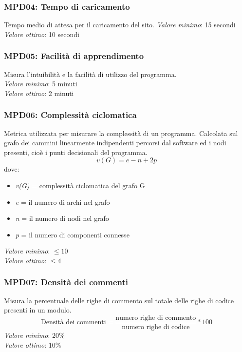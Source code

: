 \subsubsection{MPD04: Tempo di caricamento}
Tempo medio di attesa per il caricamento del sito.
\textit{Valore minimo}: 15 secondi\\
\textit{Valore ottimo}: 10 secondi\\

\subsubsection{MPD05: Facilità di apprendimento}
Misura l'intuibilità e la facilità di utilizzo del programma.\\
\textit{Valore minimo}: 5 minuti\\
\textit{Valore ottimo}: 2 minuti\\

\subsubsection{MPD06: Complessità ciclomatica}
Metrica utilizzata per misurare la complessità di un programma. Calcolata sul grafo dei cammini linearmente indipendenti percorsi dal software ed i nodi presenti, cioè i punti decisionali del programma.\\
\begin{equation*}
v(G) = e - n + 2p
\end{equation*}
dove:
\begin{itemize}
	\item \textit{v(G)} = complessità ciclomatica del grafo G
	\item \textit{e} = il numero di archi nel grafo
	\item \textit{n} = il numero di nodi nel grafo
	\item \textit{p} = il numero di componenti connesse
\end{itemize}
\textit{Valore minimo}: $ \le 10 $\\
\textit{Valore ottimo}: $ \le 4 $\\

\subsubsection{MPD07: Densità dei commenti}
Misura la percentuale delle righe di commento sul totale delle righe di codice presenti in un modulo.\\
\begin{equation*}
\text{Densità dei commenti}=\frac{\text{numero righe di commento}}{\text{numero righe di codice}}*100
\end{equation*}
\textit{Valore minimo}: 20\%\\
\textit{Valore ottimo}: 10\%\\

